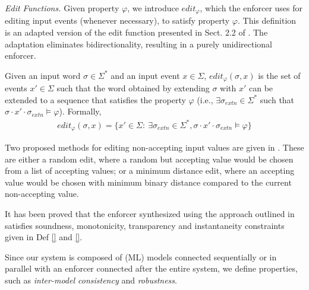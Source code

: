 \noindent \textit{Edit Functions.} Given property $\varphi$, we introduce $edit_{\varphi}$, which the enforcer uses for
editing input events (whenever necessary), to satisfy property $\varphi$. This definition is an adapted version of the edit function presented in Sect. 2.2 of \cite{}. The adaptation eliminates bidirectionality, resulting in a purely unidirectional enforcer.
\begin{definition}
    Given an input word $\sigma \in \Sigma^{\ast}$ and an input event $x \in \Sigma$, $edit_{\varphi}(\sigma, x)$ is the set of events $x' \in \Sigma$ such that the word obtained by extending $\sigma$ with $x'$ can be extended to a sequence that satisfies the property $\varphi$ (i.e., $\exists \sigma_{extn} \in  \Sigma^{\ast}$ such that $\sigma \cdot x' \cdot \sigma_{extn} \models \varphi$). Formally,
    \begin{align*}
        edit_{\varphi}(\sigma, x) = \{x' \in \Sigma:~ \exists \sigma_{extn} \in  \Sigma^{\ast}, \sigma \cdot x' \cdot \sigma_{extn} \models \varphi\}
    \end{align*}
\end{definition}
Two proposed methods for editing non-accepting input values are given in \cite{}. These are either a random edit, where a random but accepting value would be chosen from a list of accepting values; or a minimum distance edit, where an accepting value would be chosen with minimum binary distance compared to the current
non-accepting value.

\begin{remark}
    It has been proved that the enforcer synthesized using the approach outlined in \cite{} satisfies soundness, monotonicity, transparency and instantaneity constraints given in Def \ref{} and \ref{}.
\end{remark}

Since our system is composed of (ML) models connected sequentially or in parallel with an enforcer connected after the entire system, we define properties, such as \textit{inter-model consistency} and \textit{robustness}. %


